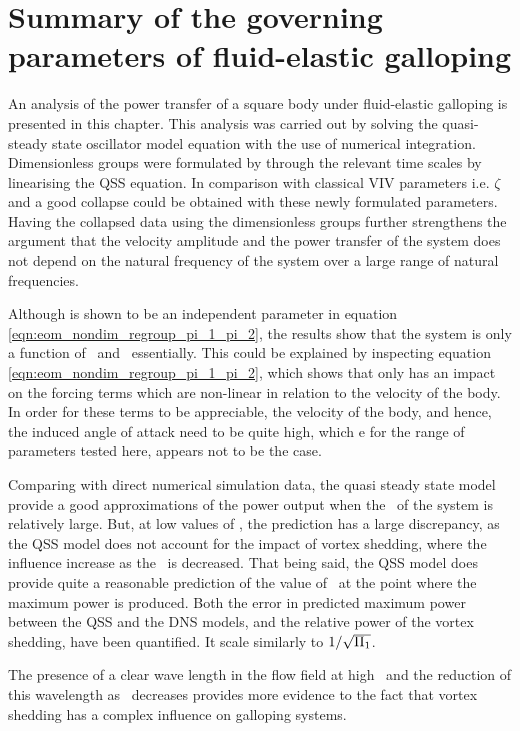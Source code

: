 \section{Summary of the governing parameters of  fluid-elastic galloping}
\label{sec:summary-pi_1-pi_2}

An analysis of the power transfer of a square body under fluid-elastic galloping is presented in this chapter. This analysis was carried out by solving the quasi-steady state oscillator model equation with the use of numerical integration. Dimensionless groups were formulated by through the relevant time scales by linearising the QSS equation. In comparison with classical VIV parameters i.e. $\zeta$ and \ustar a good collapse could be obtained with these newly formulated parameters. Having the collapsed data using the dimensionless groups further strengthens the argument that the velocity amplitude and the power transfer of the system does not depend on the natural frequency of the system over a large range of natural frequencies.


Although \mstar is shown to be an independent parameter in equation \ref{eqn:eom_nondim_regroup_pi_1_pi_2}, the results show that the system is only a function of \massstiff\ and \massdamp\ essentially. This could be explained by inspecting equation \ref{eqn:eom_nondim_regroup_pi_1_pi_2}, which shows that \mstar only has an impact on the forcing terms which are non-linear in relation to the velocity of the body. In order for these terms to be appreciable, the velocity of the body, and hence, the induced angle of attack need to be quite high, which e for the range of parameters tested here, appears not to be the case. 

Comparing with direct numerical simulation data, the quasi steady state model provide a good approximations of the power output when the \massstiff\ of the system is relatively large. But, at low values of \massstiff, the prediction has a large discrepancy, as the QSS model does not account for the impact of vortex shedding, where the influence increase as the \massstiff\ is decreased. That being said, the QSS model does provide quite a reasonable prediction of the value of \massstiff\ at the point where the maximum power is produced. Both the error in predicted maximum power between the QSS and the DNS models, and the relative power of the vortex shedding, have been quantified. It scale similarly to $1/\sqrt{\Pi_1}$.

The presence of a clear wave length in the flow field at high \massstiff\ and the reduction of this wavelength as \massstiff\ decreases provides more evidence to the fact that vortex shedding has a complex influence on galloping systems.  





    


